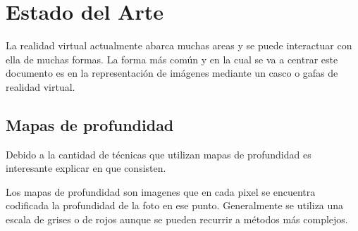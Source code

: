 
\pagestyle{empty}
\chapter {Estado del Arte}

La realidad virtual actualmente abarca muchas areas y se puede interactuar con ella de muchas formas. La forma más común y en la cual se va a centrar este documento es en la representación de imágenes mediante un casco o gafas de realidad virtual.





\section{Mapas de profundidad}
Debido a la cantidad de técnicas que utilizan mapas de profundidad es interesante explicar en que consisten. 

Los mapas de profundidad son imagenes que en cada pixel se encuentra codificada la profundidad de la foto en ese punto. Generalmente se utiliza una escala de grises o de rojos aunque se pueden recurrir a métodos más complejos.\cite{Josh6DoFUnity}


